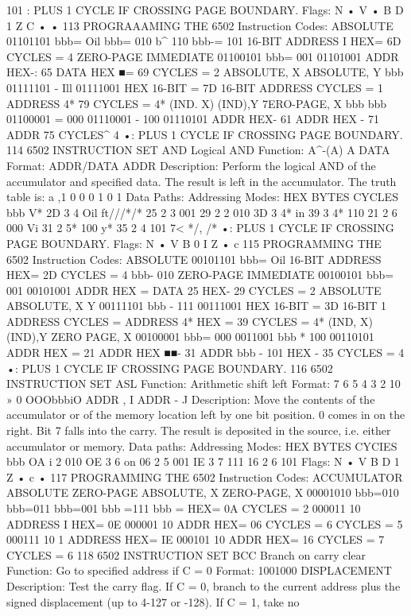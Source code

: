 101
: PLUS 1 CYCLE IF CROSSING PAGE BOUNDARY.
Flags: N
•
V
•
B D 1 Z C
• •
113
PROGRAAAMING THE 6502
Instruction Codes:
ABSOLUTE 01101101
bbb= Oil
bbb= 010
b^ 110
bbb-= 101
16-BIT ADDRESS
I
HEX= 6D CYCLES = 4
ZERO-PAGE
IMMEDIATE
01100101
bbb= 001
01101001
ADDR
HEX-: 65
DATA
HEX ■= 69 CYCLES = 2
ABSOLUTE, X
ABSOLUTE, Y
bbb
01111101
- Ill
01111001
HEX
16-BIT
= 7D
16-BIT
ADDRESS
CYCLES =
1
ADDRESS
4*
79 CYCLES = 4*
(IND. X)
(IND),Y
7ERO-PAGE, X
bbb
bbb
01100001
= 000
01110001
- 100
01110101
ADDR
HEX- 61
ADDR
HEX - 71
ADDR
75 CYCLES^ 4
•: PLUS 1 CYCLE IF CROSSING PAGE BOUNDARY.
114
6502 INSTRUCTION SET
AND Logical AND
Function: A^-(A) A DATA
Format: ADDR/DATA ADDR
Description:
Perform the logical AND of the accumulator and specified data.
The result is left in the accumulator.
The truth table is:
a
,1
0
0
0
1
0
1
Data Paths:
Addressing Modes:
HEX
BYTES
CYCLES
bbb
V*
2D
3
4
Oil
ft///*/*
25
2
3
001
29
2
2
010
3D
3
4*
in
39
3
4*
110
21
2
6
000
Vi
31
2
5*
100
y*
35
2
4
101
7<
*/,
/*
•: PLUS 1 CYCLE IF CROSSING PAGE BOUNDARY.
Flags:
N
•
V B 0 I Z
•
c
115
PROGRAMMING THE 6502
Instruction Codes:
ABSOLUTE 00101101
bbb= Oil
16-BIT ADDRESS
HEX= 2D CYCLES = 4
bbb- 010
ZERO-PAGE
IMMEDIATE
00100101
bbb= 001
00101001
ADDR
HEX =
DATA
25
HEX- 29 CYCLES = 2
ABSOLUTE
ABSOLUTE,
X
Y
00111101
bbb - 111
00111001
HEX
16-BIT
= 3D
16-BIT
1
ADDRESS
CYCLES =
ADDRESS
4*
HEX = 39 CYCLES = 4*
(IND, X)
(IND),Y
ZERO PAGE, X
00100001
bbb= 000
0011001
bbb * 100
00110101
ADDR
HEX = 21
ADDR
HEX ■■- 31
ADDR
bbb - 101 HEX - 35 CYCLES = 4
•: PLUS 1 CYCLE IF CROSSING PAGE BOUNDARY.
116
6502 INSTRUCTION SET
ASL
Function:
Arithmetic shift left
Format:
7 6 5 4 3 2 10 » 0
OOObbbiO ADDR
,
I ADDR
- J
Description:
Move the contents of the accumulator or of the memory location
left by one bit position. 0 comes in on the right. Bit 7 falls into the
carry. The result is deposited in the source, i.e. either accumulator
or memory.
Data paths:
Addressing Modes:
HEX
BYTES
CYCIES
bbb
OA
i
2
010
OE
3
6
on
06
2
5
001
IE
3
7
111
16
2
6
101
Flags:
N
•
V B D 1 Z
•
c
•
117
PROGRAMMING THE 6502
Instruction Codes:
ACCUMULATOR
ABSOLUTE
ZERO-PAGE
ABSOLUTE, X
ZERO-PAGE, X
00001010
bbb=010
bbb=011
bbb=001
bbb =111
bbb =
HEX= 0A CYCLES = 2
000011 10 ADDRESS
I
HEX= 0E
000001 10 ADDR
HEX= 06
CYCLES = 6
CYCLES = 5
000111 10
1
ADDRESS
HEX= IE
000101 10 ADDR
HEX= 16
CYCLES = 7
CYCLES = 6
118
6502 INSTRUCTION SET
BCC Branch on carry clear
Function:
Go to specified address if C = 0
Format:
1001000 DISPLACEMENT
Description:
Test the carry flag. If C = 0, branch to the current address plus
the signed displacement (up to 4-127 or -128). If C = 1, take no
